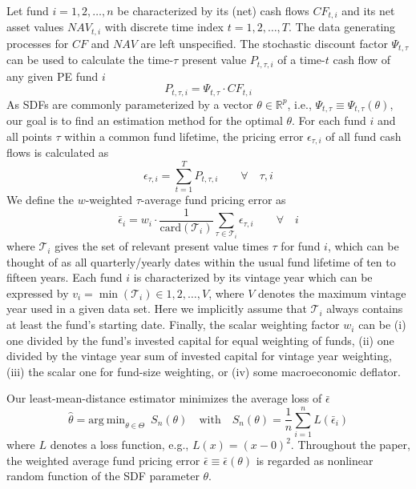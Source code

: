 \documentclass[12pt]{article}
\begin{document}
Let fund $i=1,2,\dots,n$ be characterized by its (net) cash flows ${CF}_{t,i}$ and its net asset values ${NAV}_{t,i}$ with discrete time index $t=1,2,\dots,T$.
The data generating processes for $CF$ and $NAV$ are left unspecified.
The stochastic discount factor $\Psi_{t,\tau}$ can be used to calculate the time-$\tau$ present value $P_{t,\tau,i}$ of a time-$t$ cash flow of any given PE fund $i$
\begin{equation}
\label{eq:price}
P_{t,\tau,i} = \Psi_{t,\tau} \cdot CF_{t,i}
\end{equation}
As SDFs are commonly parameterized by a vector $\theta \in \mathbb{R}^p$, i.e., $\Psi_{t,\tau} \equiv \Psi_{t,\tau} (\theta)$, our goal is to find an estimation method for the optimal $\theta$.
For each fund $i$ and all points $\tau$ within a common fund lifetime, the pricing error $\epsilon_{\tau,i}$ of all fund cash flows is calculated as
\begin{equation}
\label{eq:pricing_error}
\epsilon_{\tau,i} = \sum_{t=1}^T P_{t,\tau,i} 
\qquad \forall \quad \tau,i
\end{equation}
We define the $w$-weighted $\tau$-average fund pricing error as
\begin{equation}
\label{eq:average_pricing_error}
\bar{\epsilon}_{i} =
w_{i} \cdot
\frac{1}{\mathrm{card}( \mathcal{T}_{i}) }
\sum_{\tau \in \mathcal{T}_{i}}
\epsilon_{\tau,i}
\qquad \forall \quad i
\end{equation}
where $\mathcal{T}_i$ gives the set of relevant present value times $\tau$ for fund $i$, which can be thought of as all quarterly/yearly dates within the usual fund lifetime of ten to fifteen years.
Each fund $i$ is characterized by its vintage year which can be expressed by $v_{i}=\min(\mathcal{T}_i) \in 1,2,\dots,V$, where $V$ denotes the maximum vintage year used in a given data set.
Here we implicitly assume that $\mathcal{T}_i$ always contains at least the fund's starting date.
Finally, the scalar weighting factor $w_i$ can be (i) one divided by the fund's invested capital for equal weighting of funds, (ii) one divided by the vintage year sum of invested capital for vintage year weighting, (iii) the scalar one for fund-size weighting, or (iv) some macroeconomic deflator.

Our least-mean-distance estimator minimizes the average loss of $\bar{\epsilon}$
\begin{equation}
\label{eq:estimator}
\hat{\theta} = 
\mathrm{arg \ min}_{\theta \in \Theta}
\enspace
S_n(\theta)
\quad
\mathrm{with}
\quad
S_n(\theta) = 
\frac{1}{n}
\sum_{i=1}^n
L \left( \bar{\epsilon}_{i} \right) 
\end{equation}
where $L$ denotes a loss function, e.g., $L(x)=(x-0)^2$.
Throughout the paper, the weighted average fund pricing error $\bar{\epsilon} \equiv \bar{\epsilon}(\theta)$ is regarded as nonlinear random function of the SDF parameter $\theta$.
\end{document}
